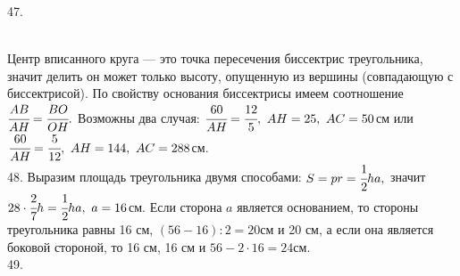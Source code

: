 \documentclass[12pt]{article}
\begin{document}
47. \begin{figure}[ht!]
\end{figure}\\
Центр вписанного круга --- это точка пересечения биссектрис треугольника, значит делить он может только высоту, опущенную из вершины (совпадающую с биссектрисой). По свойству основания биссектрисы имеем соотношение $\cfrac{AB}{AH}=\cfrac{BO}{OH}.$ Возможны два случая: $\cfrac{60}{AH}=\cfrac{12}{5},\ AH=25,\ AC=50$см или
$\cfrac{60}{AH}=\cfrac{5}{12},\ AH=144,\ AC=288$см.\\
48. Выразим площадь треугольника двумя способами: $S=pr=\cfrac{1}{2}ha,$ значит $28\cdot\cfrac{2}{7}h=\cfrac{1}{2}ha,\ a=16$см. Если сторона $a$ является основанием, то стороны треугольника равны 16 см, $(56-16):2=20$см и 20 см, а если она является боковой стороной, то 16 см, 16 см и $56-2\cdot16=24$см.\\
49. \begin{figure}[ht!]
\end{figure}\\
\end{document}

